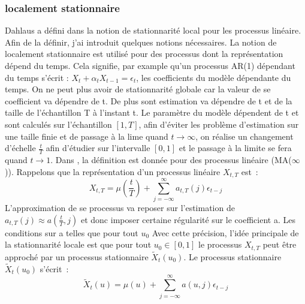 \documentclass[11pt]{scrartcl} %
\begin{document}
\subsubsection{localement stationnaire}
Dahlaus a défini dans \cite{locally} la notion de stationnarité local pour les processus linéaire. Afin de la définir, j'ai introduit quelques notions nécessaires. La notion de localement stationnaire est utilisé pour des processus dont la représentation dépend du temps. Cela signifie, par example qu'un processus AR(1) dépendant du temps s'écrit : $X_t+\alpha_tX_{t-1}=\epsilon_t$, les coefficients du modèle dépendante du temps. On ne peut plus avoir de stationnarité globale car la valeur de se coefficient va dépendre de t. De plus sont estimation va dépendre de t et de la taille de l'échantillon T à l'instant t. Le paramètre du modèle dépendent de t et sont calculés sur l'échantillon $[1,T]$, afin d'éviter les problème d'estimation sur une taille finie et de passage à la lime quand $t\rightarrow \infty$, on réalise un changement d'échelle $\frac{t}{T}$ afin d'étudier sur l'intervalle $[0,1]$ et le passage à la limite se fera quand $t\rightarrow 1$. Dans \cite{locally}, la définition est donnée pour des processus linéaire (MA($\infty$)). Rappelons que la représentation d'un processus linéaire $X_{t,T}$ est~:
$$
X_{t,T}=\mu\left(\frac{t}{T}\right)+\sum_{j=-\infty}^\infty a_{t,T}(j)\epsilon_{t-j}
$$
L'approximation de se processus va reposer sur l'estimation de $a_{t,T}(j)\approx a(\frac{t}{T},j)$ et donc imposer certaine régularité sur le coefficient a. Les conditions sur a telles que pour tout $u_0$
Avec cette précision, l'idée principale de la stationnarité locale est que pour tout $u_0\in [0,1]$ le processus $X_{t,T}$ peut être approché par un processus stationnaire $\tilde{X}_t(u_0)$. Le processus stationnaire $\tilde{X}_t(u_0)$ s'écrit~:
$$
\tilde{X}_t(u)=\mu(u)+\sum_{j=-\infty}^\infty a(u,j)\epsilon_{t-j}
$$
\end{document}
